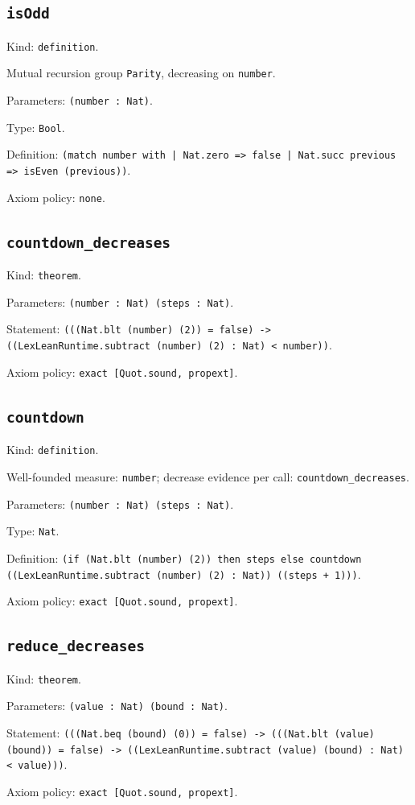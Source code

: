 \documentclass[11pt]{article}
\begin{document}
\subsection*{\texttt{isOdd}}
\noindent Kind: \texttt{definition}.\par
\noindent Mutual recursion group \texttt{Parity}, decreasing on \texttt{number}.\par
\noindent Parameters: \texttt{(number : Nat)}.\par
\noindent Type: \texttt{Bool}.\par
\noindent Definition: \texttt{(match number with | Nat.zero => false | Nat.succ previous => isEven (previous))}.\par
\noindent Axiom policy: \texttt{none}.\par
\subsection*{\texttt{countdown\_decreases}}
\noindent Kind: \texttt{theorem}.\par
\noindent Parameters: \texttt{(number : Nat) (steps : Nat)}.\par
\noindent Statement: \texttt{(((Nat.blt (number) (2)) = false) -> ((LexLeanRuntime.subtract (number) (2) : Nat) < number))}.\par
\noindent Axiom policy: \texttt{exact [Quot.sound, propext]}.\par
\subsection*{\texttt{countdown}}
\noindent Kind: \texttt{definition}.\par
\noindent Well-founded measure: \texttt{number}; decrease evidence per call: \texttt{countdown\_decreases}.\par
\noindent Parameters: \texttt{(number : Nat) (steps : Nat)}.\par
\noindent Type: \texttt{Nat}.\par
\noindent Definition: \texttt{(if (Nat.blt (number) (2)) then steps else countdown ((LexLeanRuntime.subtract (number) (2) : Nat)) ((steps + 1)))}.\par
\noindent Axiom policy: \texttt{exact [Quot.sound, propext]}.\par
\subsection*{\texttt{reduce\_decreases}}
\noindent Kind: \texttt{theorem}.\par
\noindent Parameters: \texttt{(value : Nat) (bound : Nat)}.\par
\noindent Statement: \texttt{(((Nat.beq (bound) (0)) = false) -> (((Nat.blt (value) (bound)) = false) -> ((LexLeanRuntime.subtract (value) (bound) : Nat) < value)))}.\par
\noindent Axiom policy: \texttt{exact [Quot.sound, propext]}.\par
\end{document}
